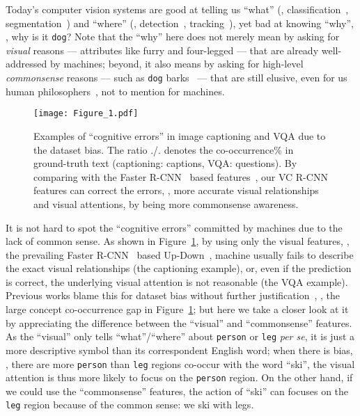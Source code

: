 \documentclass[10pt,twocolumn,letterpaper]{article}
\begin{document}
\vspace{-0.13in}
Today's computer vision systems are good at telling us ``what'' (\eg, classification~\cite{he2016deep, krizhevsky2012imagenet}, segmentation~\cite{he2017mask, long2015fully}) and ``where'' (\eg, detection~\cite{ren2015faster, liu2016ssd}, tracking~\cite{kristan2015visual, li2019siamrpn++}), yet bad at knowing ``why'', \eg, why is it \texttt{dog}? Note that the ``why'' here does not merely mean by asking for \emph{visual} reasons --- attributes like furry and four-legged --- that are already well-addressed by machines; beyond, it also means by asking for high-level \emph{commonsense} reasons --- 
such as \texttt{dog} barks~\cite{gibson1977theory} --- that are still elusive, even for us human philosophers~\cite{rosenfeld2011common, halloun1985common,smith1995structures}, not to mention for machines.


\begin{figure}[t]
\begin{center}
\texttt{[image: Figure\_1.pdf]}
\end{center}
  \caption{Examples of ``cognitive errors'' in image captioning and VQA due to the dataset bias. The ratio ./. denotes the co-occurrence\% in ground-truth text (captioning: captions, VQA: questions). By comparing with the Faster R-CNN~\cite{ren2015faster} based features~\cite{anderson2018bottom}, our VC R-CNN features can correct the errors, \eg, more accurate visual relationships and visual attentions, by being more commonsense awareness.}
\label{fig:figure1}
\vspace{-0.5cm}
\end{figure}

It is not hard to spot the ``cognitive errors'' committed by machines due to the lack of common sense. As shown in Figure~\ref{fig:figure1}, by using only the visual features, \eg, the prevailing Faster R-CNN~\cite{ren2015faster} based Up-Down~\cite{anderson2018bottom}, machine usually fails to describe the exact visual relationships (the captioning example), or, even if the prediction is correct, the underlying visual attention is not reasonable (the VQA example). Previous works blame this for dataset bias without further justification~\cite{hendricks2018women,manjunatha2019explicit,ramakrishnan2018overcoming,cadene2019rubi}, \eg, the large concept co-occurrence gap in Figure~\ref{fig:figure1}; but here we take a closer look at it by appreciating the difference between the ``visual'' and ``commonsense'' features. As the ``visual'' only tells ``what''/``where'' about \texttt{person} or \texttt{leg} \emph{per se}, it is just a more descriptive symbol than its correspondent English word; when there is bias, \eg, there are more \texttt{person} than \texttt{leg} regions co-occur with the word ``ski'', the visual attention is thus more likely to focus on the \texttt{person} region. On the other hand, if we could use the ``commonsense'' features, the action of ``ski'' can focuses on the \texttt{leg} region because of the common sense: we ski with legs.
\end{document}
